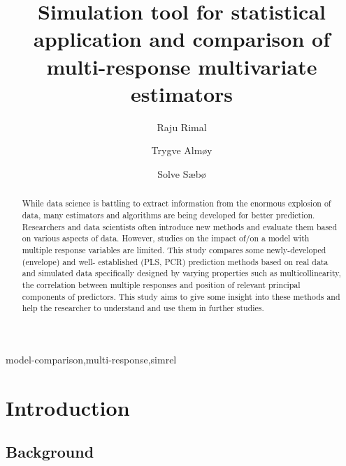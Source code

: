 \documentclass[12pt,3p,authoryear]{elsarticle}
\begin{document}
\begin{frontmatter}

  \title{Simulation tool for statistical application and comparison of
multi-response multivariate estimators}
  
    \author[KBM]{Raju Rimal}
    \author[KBM]{Trygve Almøy}
  
    \author[NMBU]{Solve Sæbø}
  
      \address[KBM]{Faculty of Chemistry and Bioinformatics, Norwegian University of Life
Sciences, Ås, Norway}
    \address[NMBU]{Professor, Norwegian University of Life Sciences, Ås, Norway}
  
  \begin{abstract}
  While data science is battling to extract information from the enormous
  explosion of data, many estimators and algorithms are being developed
  for better prediction. Researchers and data scientists often introduce
  new methods and evaluate them based on various aspects of data. However,
  studies on the impact of/on a model with multiple response variables are
  limited. This study compares some newly-developed (envelope) and well-
  established (PLS, PCR) prediction methods based on real data and
  simulated data specifically designed by varying properties such as
  multicollinearity, the correlation between multiple responses and
  position of relevant principal components of predictors. This study aims
  to give some insight into these methods and help the researcher to
  understand and use them in further studies.
  \end{abstract}
   \begin{keyword} model-comparison,multi-response,simrel\end{keyword}

\end{frontmatter}

\tableofcontents


\section{Introduction}\label{introduction}

\subsection{Background}\label{background}


\renewcommand\refname{References}





\end{document}
